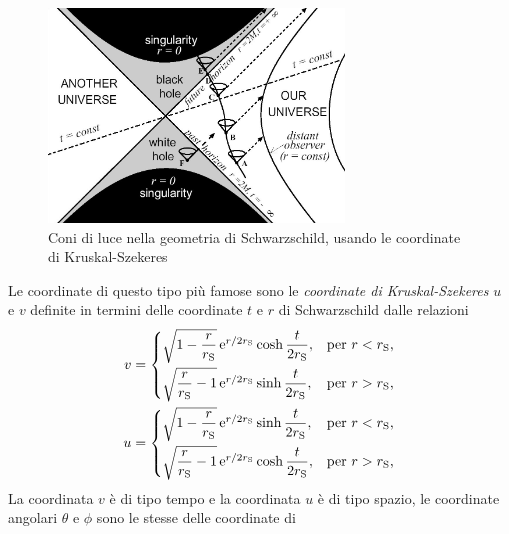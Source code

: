 \begin{figure}
  \centering
  \includegraphics[width=0.7\textwidth]{figure/kruskal}
  \caption{Coni di luce nella geometria di Schwarzschild, usando le coordinate
    di Kruskal-Szekeres}
  \label{fig:coni-kruskal}
\end{figure}
Le coordinate di questo tipo più famose sono le \emph{coordinate di
  Kruskal-Szekeres} \(u\) e \(v\) definite
in termini delle coordinate \(t\) e \(r\) di Schwarzschild dalle
relazioni~\parencites{1960PhRv..119.1743K}{1960PMatD...7..285S}
\begin{subequations}
  \allowdisplaybreaks{}
  \begin{align}
    v &=
    \begin{cases}
      \sqrt{1 - \dfrac{r}{r_{\textup{S}}}}\e^{r/2r_{\textup{S}}} \cosh
      \dfrac{t}{2r_{\textup{S}}}, & \text{per \(r < r_{\textup{S}}\),} \\[2.1ex]
      \sqrt{\dfrac{r}{r_{\textup{S}}} - 1}\e^{r/2r_{\textup{S}}} \sinh
      \dfrac{t}{2r_{\textup{S}}}, & \text{per \(r > r_{\textup{S}}\),}
    \end{cases} \\
    u &=
    \begin{cases}
      \sqrt{1 - \dfrac{r}{r_{\textup{S}}}}\e^{r/2r_{\textup{S}}} \sinh
      \dfrac{t}{2r_{\textup{S}}}, & \text{per \(r < r_{\textup{S}}\),} \\[2.1ex]
      \sqrt{\dfrac{r}{r_{\textup{S}}} - 1}\e^{r/2r_{\textup{S}}} \cosh
      \dfrac{t}{2r_{\textup{S}}}, & \text{per \(r > r_{\textup{S}}\),}
    \end{cases}
  \end{align}
\end{subequations}
La coordinata \(v\) è di tipo tempo e la coordinata \(u\) è di tipo spazio, le
coordinate angolari \(\theta\) e \(\phi\) sono le stesse delle coordinate di

